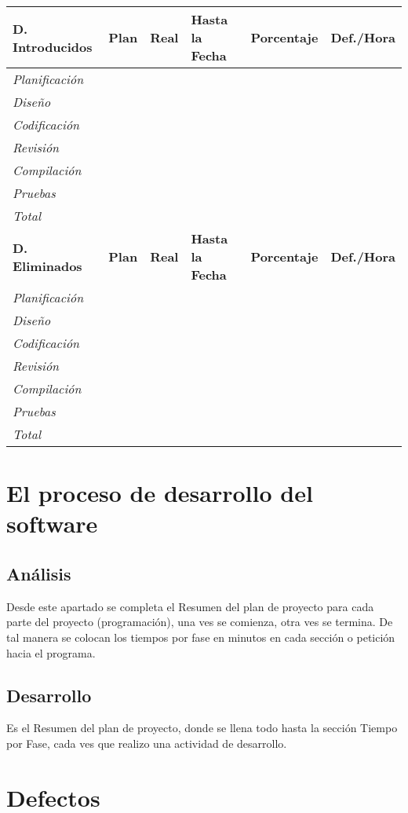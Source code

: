 \documentclass[a4paper,12pt,openany,oneside]{book}
\begin{document}
\newpage
\begin{tabular}{| l | l | l | l | l | l |}
\hline
\textbf{D. Introducidos} & \textbf{Plan} & \textbf{Real} & \textbf{Hasta la Fecha} & \textbf{Porcentaje} & \textbf{Def./Hora} \\
\hline
\textit{Planificación} & & & & & \\
\hline
\textit{Diseño} & & & & & \\
\hline
\textit{Codificación} & & & & & \\
\hline
\textit{Revisión} & & & & & \\
\hline
\textit{Compilación} & & & & & \\
\hline
\textit{Pruebas} & & & & & \\
\hline
\textit{Total} & & & & & \\
\hline
\textbf{D. Eliminados} & \textbf{Plan} & \textbf{Real} & \textbf{Hasta la Fecha} & \textbf{Porcentaje} & \textbf{Def./Hora} \\
\hline
\textit{Planificación} & & & & & \\
\hline
\textit{Diseño} & & & & & \\
\hline
\textit{Codificación} & & & & & \\
\hline
\textit{Revisión} & & & & & \\
\hline
\textit{Compilación} & & & & & \\
\hline
\textit{Pruebas} & & & & & \\
\hline
\textit{Total} & & & & & \\
\hline
\end{tabular}
\chapter{El proceso de desarrollo del software}
\thispagestyle{empty}
\section{Análisis}
Desde este apartado se completa el Resumen del plan de proyecto para cada parte del proyecto (programación), una ves se comienza, otra ves se termina. De tal manera se colocan los tiempos por fase en minutos en cada sección o petición hacia el programa.
\section{Desarrollo}
Es el Resumen del plan de proyecto, donde se llena todo hasta la sección Tiempo por Fase, cada ves que realizo una actividad de desarrollo.
\chapter{Defectos}
\thispagestyle{empty}
\end{document}

